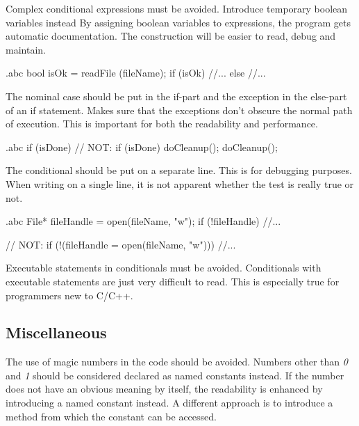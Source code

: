 \recommendation
{Complex conditional expressions must be avoided. Introduce temporary boolean variables instead}
{}
{By assigning boolean variables to expressions, the program gets automatic documentation. The construction will be easier to read, debug and maintain.}


\begin{filecontents*}{\jobname.abc}
	bool isOk = readFile (fileName);
	if (isOk) {
		//...
	}
	else {
		//...
	}
\end{filecontents*}

\recommendation
{The nominal case should be put in the if-part and the exception in the else-part of an if statement.}
{}
{Makes sure that the exceptions don't obscure the normal path of execution. This is important for both the readability and performance.}


\begin{filecontents*}{\jobname.abc}
	if (isDone)  // NOT: if (isDone) doCleanup();
		doCleanup();
\end{filecontents*}

\recommendation
{The conditional should be put on a separate line.}
{}
{This is for debugging purposes. When writing on a single line, it is not apparent whether the test is really true or not.}


\begin{filecontents*}{\jobname.abc}
	File* fileHandle = open(fileName, "w");
	if (!fileHandle) {
		//...
	}
	
	// NOT:
	if (!(fileHandle = open(fileName, "w"))) {
		//...
	}
\end{filecontents*}

\recommendation
{Executable statements in conditionals must be avoided.}
{}
{Conditionals with executable statements are just very difficult to read. This is especially true for programmers new to C/C++.}

\subsection{Miscellaneous}

\recommendation
{The use of magic numbers in the code should be avoided. Numbers other than \textit{0} and \textit{1} should be considered declared as named constants instead.}
{}
{If the number does not have an obvious meaning by itself, the readability is enhanced by introducing a named constant instead. A different approach is to introduce a method from which the constant can be accessed.}


